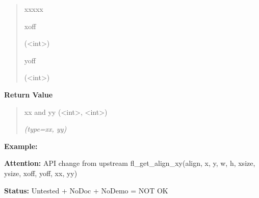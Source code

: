 \begin{boxedminipage}{\funcwidth}
\begin{quote}
\begin{Ventry}{xxxxx}
          \item[xoff]

          ({\textless}int{\textgreater})

          \item[yoff]

          ({\textless}int{\textgreater})

        \end{Ventry}

      \end{quote}

      \textbf{Return Value}
    \vspace{-1ex}

      \begin{quote}
      xx and yy ({\textless}int{\textgreater}, 
      {\textless}int{\textgreater})

      {\it (type=xx, yy)}

      \end{quote}

\textbf{Example:} 

\textbf{Attention:} API change from upstream fl\_get\_align\_xy(align, x, y, w, h, xsize, 
ysize, xoff, yoff, xx, yy)



\textbf{Status:} Untested + NoDoc + NoDemo = NOT OK



    \end{boxedminipage}

    \label{xformslib:library:fl_drw_text}

    \vspace{0.5ex}

